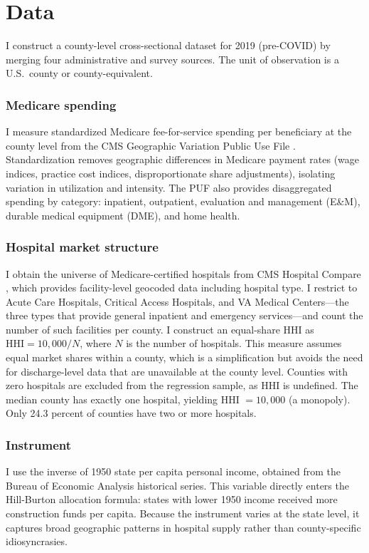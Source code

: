 \documentclass[12pt]{article}
\begin{document}
\section{Data}

I construct a county-level cross-sectional dataset for 2019 (pre-COVID) by merging four administrative and survey sources. The unit of observation is a U.S.\ county or county-equivalent.

\subsubsection*{Medicare spending} I measure standardized Medicare fee-for-service spending per beneficiary at the county level from the CMS Geographic Variation Public Use File \citep{cms2019gvpuf}. Standardization removes geographic differences in Medicare payment rates (wage indices, practice cost indices, disproportionate share adjustments), isolating variation in utilization and intensity. The PUF also provides disaggregated spending by category: inpatient, outpatient, evaluation and management (E\&M), durable medical equipment (DME), and home health.

\subsubsection*{Hospital market structure} I obtain the universe of Medicare-certified hospitals from CMS Hospital Compare \citep{cms2024compare}, which provides facility-level geocoded data including hospital type. I restrict to Acute Care Hospitals, Critical Access Hospitals, and VA Medical Centers---the three types that provide general inpatient and emergency services---and count the number of such facilities per county. I construct an equal-share HHI as $\text{HHI} = 10{,}000 / N$, where $N$ is the number of hospitals. This measure assumes equal market shares within a county, which is a simplification but avoids the need for discharge-level data that are unavailable at the county level. Counties with zero hospitals are excluded from the regression sample, as HHI is undefined. The median county has exactly one hospital, yielding HHI $= 10{,}000$ (a monopoly). Only 24.3 percent of counties have two or more hospitals.

\subsubsection*{Instrument} I use the inverse of 1950 state per capita personal income, obtained from the Bureau of Economic Analysis historical series. This variable directly enters the Hill-Burton allocation formula: states with lower 1950 income received more construction funds per capita. Because the instrument varies at the state level, it captures broad geographic patterns in hospital supply rather than county-specific idiosyncrasies.
\end{document}
